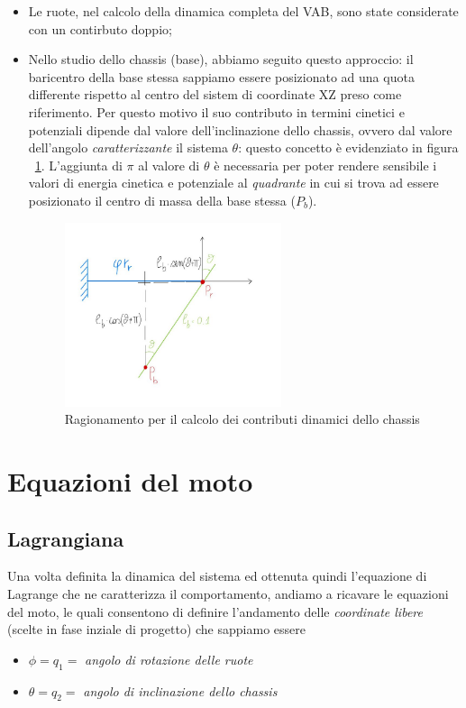 \begin{itemize}
 	\item Le ruote, nel calcolo della dinamica completa del VAB, sono state considerate con un contirbuto doppio;
 	
 	\item Nello studio dello chassis (base), abbiamo seguito questo approccio: il baricentro della base stessa sappiamo essere posizionato ad una quota differente rispetto al centro del sistem di coordinate XZ preso come riferimento.
 	Per questo motivo il suo contributo in termini cinetici e potenziali dipende dal valore dell'inclinazione dello chassis, ovvero dal valore dell'angolo \textit{caratterizzante} il sistema $\theta$: questo concetto è evidenziato in figura ~\ref{fig:chassis}.
 	L'aggiunta di \textit{$\pi$} al valore di $\theta$ è necessaria per poter rendere sensibile i valori di energia cinetica e potenziale al \textit{quadrante} in cui si trova ad essere posizionato il centro di massa della base stessa ($P_b$).
 	
 	\begin{figure}[h]
 		\centering   	
 		\includegraphics[width=0.6\textwidth]{Immagini/ChassisAngle.jpg}
 		\caption{Ragionamento per il calcolo dei contributi dinamici dello chassis}
 		\label{fig:chassis}
 	\end{figure}
 	
\end{itemize}

\newpage
\section{Equazioni del moto}
\subsection{Lagrangiana}
Una volta definita la dinamica del sistema ed ottenuta quindi l'equazione di Lagrange che ne caratterizza il comportamento, andiamo a ricavare le equazioni del moto, le quali consentono di definire l'andamento delle \textit{coordinate libere} (scelte in fase inziale di progetto) che sappiamo essere
\begin{itemize}
	\item $\phi = q_1 =$ \textit{angolo di rotazione delle ruote}
	\item $\theta = q_2 =$ \textit{angolo di inclinazione dello chassis}
\end{itemize}

